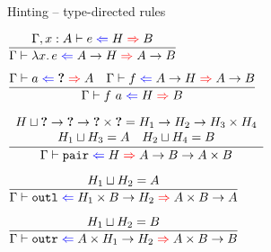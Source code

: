 \documentclass{beamer}
\begin{document}
\begin{frame}{Hinting -- type-directed rules}

\begin{center}
  $\infrule{\hinting[\extend{\Gamma}{x}{A}]{e}{H}{B}}{\hinting{\fun{x}{e}}{\Fun{A}{H}}{\Fun{A}{B}}}$

  \vspace{2em}

  $\infrule{\hinting{a}{\Hole}{A} \quad \hinting{f}{\Fun{A}{H}}{\Fun{A}{B}}}{\hinting{\app{f}{a}}{H}{B}}$

  \vspace{2em}

  $\infrule{\begin{array}{c} \sidecond{\hintlub{H}{\Fun{\Hole}{\Fun{\Hole}{\Prod{\Hole}{\Hole}}}} = \Fun{H_1}{\Fun{H_2}{\Prod{H_3}{H_4}}}} \\ \sidecond{\hintlub{H_1}{H_3} = A} \quad \sidecond{\hintlub{H_2}{H_4} = B} \end{array}}{\hinting{\pairfun}{H}{\Fun{A}{\Fun{B}{\Prod{A}{B}}}}}$

  \vspace{2em}

  $\infrule{\sidecond{\hintlub{H_1}{H_2} = A}}{\hinting{\outlfun}{\Fun{\Prod{H_1}{B}}{H_2}}{\Fun{\Prod{A}{B}}{A}}}$

  \vspace{1em}

  $\infrule{\sidecond{\hintlub{H_1}{H_2} = B}}{\hinting{\outrfun}{\Fun{\Prod{A}{H_1}}{H_2}}{\Fun{\Prod{A}{B}}{B}}}$
\end{center}

\end{frame}
\end{document}

